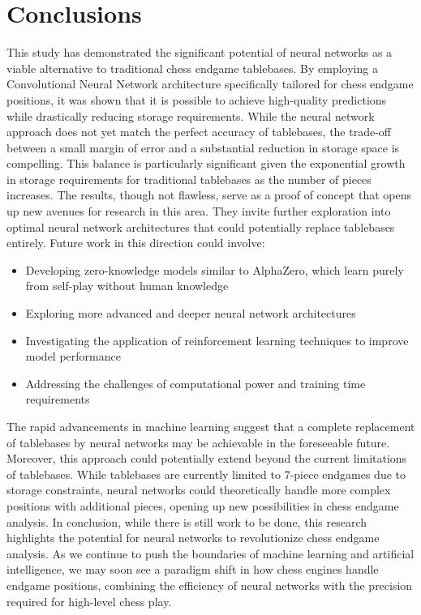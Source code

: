 \newpage
\section{Conclusions}
\label{sec:Conclusions}
This study has demonstrated the significant potential of neural networks as a viable alternative to traditional chess endgame tablebases. By employing a Convolutional Neural Network architecture specifically tailored for chess endgame positions, it was shown that it is possible to achieve high-quality predictions while drastically reducing storage requirements.
While the neural network approach does not yet match the perfect accuracy of tablebases, the trade-off between a small margin of error and a substantial reduction in storage space is compelling. This balance is particularly significant given the exponential growth in storage requirements for traditional tablebases as the number of pieces increases.
The results, though not flawless, serve as a proof of concept that opens up new avenues for research in this area. They invite further exploration into optimal neural network architectures that could potentially replace tablebases entirely. Future work in this direction could involve:
\begin{itemize}
\item Developing zero-knowledge models similar to AlphaZero, which learn purely from self-play without human knowledge
\item Exploring more advanced and deeper neural network architectures
\item Investigating the application of reinforcement learning techniques to improve model performance
\item Addressing the challenges of computational power and training time requirements
\end{itemize}
The rapid advancements in machine learning suggest that a complete replacement of tablebases by neural networks may be achievable in the foreseeable future.
Moreover, this approach could potentially extend beyond the current limitations of tablebases. While tablebases are currently limited to 7-piece endgames due to storage constraints, neural networks could theoretically handle more complex positions with additional pieces, opening up new possibilities in chess endgame analysis.
In conclusion, while there is still work to be done, this research highlights the potential for neural networks to revolutionize chess endgame analysis. As we continue to push the boundaries of machine learning and artificial intelligence, we may soon see a paradigm shift in how chess engines handle endgame positions, combining the efficiency of neural networks with the precision required for high-level chess play.